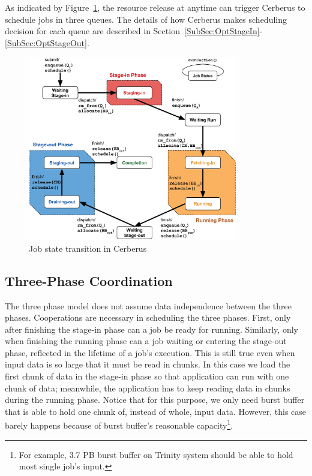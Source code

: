 As indicated by Figure~\ref{Fig:JobFSM}, the resource release at anytime can trigger Cerberus
to schedule jobs in three queues.
The details of how Cerberus makes scheduling decision for each queue are
described in Section~\ref{SubSec:OptStageIn}-\ref{SubSec:OptStageOut}.

\begin{figure}[htp]
\centering
        \includegraphics[width=3.6in]{3PhaseJobFSM}
        \caption{Job state transition in Cerberus}
\label{Fig:JobFSM}
\end{figure}

\subsection{Three-Phase Coordination}
\label{SubSec:Coordination}
The three phase model does not assume data independence between the three phases.
Cooperations are necessary in scheduling the three phases.
First, only after finishing the stage-in phase can a job be ready for running.
Similarly, only when finishing the running phase can a job waiting or entering the stage-out phase,
reflected in the lifetime of a job's execution.
This is still true even when input data is so large that it must be read in chunks.
In this case we load the first chunk of data in the stage-in phase so that application
can run with one chunk of data;
meanwhile, the application has to keep reading data in chunks during the running phase.
Notice that for this purpose, we only need burst buffer that is able to hold one chunk
of, instead of whole, input data.
However, this case barely happens because of burst buffer's reasonable capacity\footnote{For
example, 3.7 PB burst buffer on Trinity system should be able to hold most single job's input.}.

